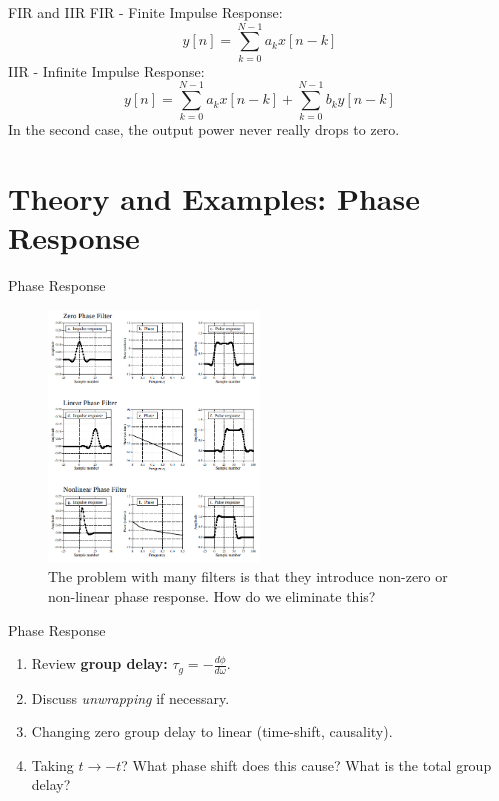 \documentclass{beamer}
\begin{document}
\begin{frame}[fragile]{FIR and IIR}
FIR - Finite Impulse Response:
\begin{equation}
y[n] = \sum_{k=0}^{N-1} a_k x[n-k]
\end{equation}
IIR - Infinite Impulse Response:
\begin{equation}
y[n] = \sum_{k=0}^{N-1} a_k x[n-k] + \sum_{k=0}^{N-1} b_k y[n-k]
\end{equation}
In the second case, the output power never really drops to zero.
\end{frame}

\section{Theory and Examples: Phase Response}

\begin{frame}{Phase Response}
\small
\begin{figure}
\centering
\includegraphics[width=0.5\textwidth]{figures/phase.png}
\caption{\label{fig:phase} The problem with many filters is that they introduce non-zero or non-linear phase response.  How do we eliminate this?}
\end{figure}
\end{frame}

\begin{frame}{Phase Response}
\begin{enumerate}
\item Review \textbf{group delay:} $\tau_g = - \frac{d\phi}{d\omega}$.
\item Discuss \textit{unwrapping} if necessary.
\item Changing zero group delay to linear (time-shift, causality).
\item Taking $t \rightarrow -t$? What phase shift does this cause?  What is the total group delay?
\end{enumerate}
\end{frame}
\end{document}
